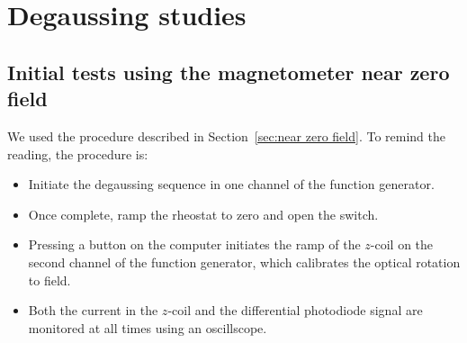  
   
\section{Degaussing studies\label{sec:degaussing}}

\subsection{Initial tests using the magnetometer near zero field}

   
  

We used the procedure described in Section~\ref{sec:near zero field}.  To
remind the reading, the procedure is:
\begin{itemize}
\item Initiate the degaussing sequence in one channel of the function
  generator.
\item Once complete, ramp the rheostat to zero and open the switch.
\item Pressing a button on the computer initiates the ramp of the
  $z$-coil on the second channel of the function generator, which
  calibrates the optical rotation to field.
\item Both the current in the $z$-coil and the differential photodiode
  signal are monitored at all times using an oscillscope.
\end{itemize}


